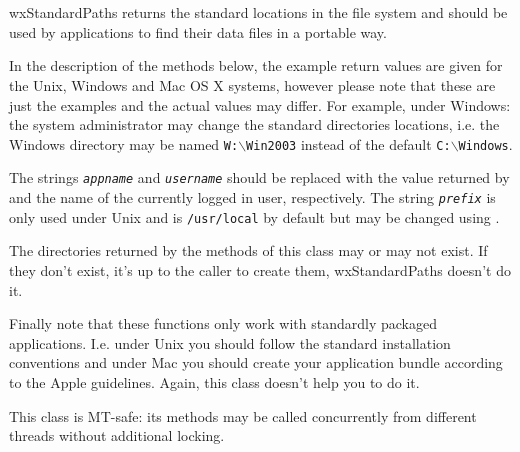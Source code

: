 
\section{}\label{wxstandardpaths}

wxStandardPaths returns the standard locations in the file system and should be
used by applications to find their data files in a portable way.

In the description of the methods below, the example return values are given
for the Unix, Windows and Mac OS X systems, however please note that these are
just the examples and the actual values may differ. For example, under Windows:
the system administrator may change the standard directories locations, i.e.
the Windows directory may be named \texttt{W:$\backslash$Win2003} instead of
the default \texttt{C:$\backslash$Windows}.

The strings \texttt{\textit{appname}} and \texttt{\textit{username}} should be
replaced with the value returned by 
and the name of the currently logged in user, respectively. The string
\texttt{\textit{prefix}} is only used under Unix and is \texttt{/usr/local} by
default but may be changed using .

The directories returned by the methods of this class may or may not exist. If
they don't exist, it's up to the caller to create them, wxStandardPaths doesn't
do it.

Finally note that these functions only work with standardly packaged
applications. I.e. under Unix you should follow the standard installation
conventions and under Mac you should create your application bundle according
to the Apple guidelines. Again, this class doesn't help you to do it.

This class is MT-safe: its methods may be called concurrently from different
threads without additional locking.


